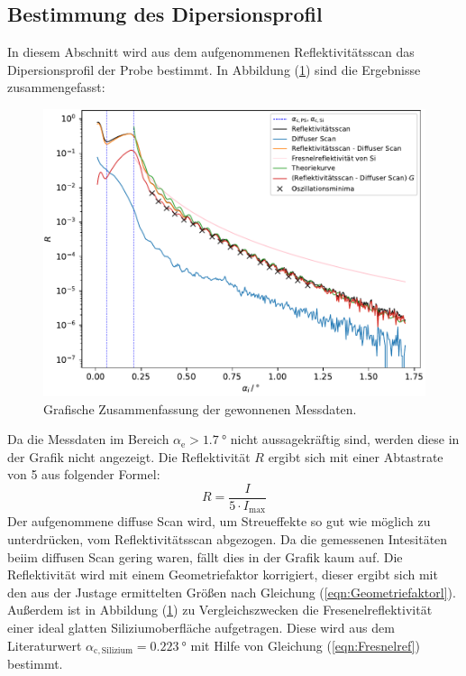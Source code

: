 \subsection{Bestimmung des Dipersionsprofil}
In diesem Abschnitt wird aus dem aufgenommenen Reflektivitätsscan das Dipersionsprofil der Probe bestimmt. In Abbildung (\ref{fig:messungr}) sind die Ergebnisse zusammengefasst:
\begin{figure}[h!]
  \centering
  \includegraphics[scale=0.7]{fig/plot_messung.pdf}
  \caption{Grafische Zusammenfassung der gewonnenen Messdaten.}
  \label{fig:messungr}
\end{figure}
\FloatBarrier
\noindent Da die Messdaten im Bereich $\alpha_\mathrm{e} > \SI{1.7}{\degree}$ nicht aussagekräftig sind, werden diese in der Grafik nicht angezeigt. Die Reflektivität $R$ ergibt sich mit einer Abtastrate von 5 aus folgender Formel:
\begin{equation}
  R=\dfrac{I}{5\cdot I_\mathrm{max}}
\end{equation}
Der aufgenommene diffuse Scan wird, um Streueffekte so gut wie möglich zu unterdrücken, vom Reflektivitätsscan abgezogen. Da die gemessenen Intesitäten beiim diffusen Scan gering waren, fällt
dies in der Grafik kaum auf. Die Reflektivität wird mit einem Geometriefaktor korrigiert, dieser ergibt sich mit den aus der Justage ermittelten Größen nach Gleichung (\ref{eqn:Geometriefaktorl}). Außerdem ist in Abbildung (\ref{fig:messungr}) zu Vergleichszwecken die Fresenelreflektivität einer ideal glatten Siliziumoberfläche  aufgetragen.
Diese wird aus dem Literaturwert \cite[5]{Anleitung3} $\alpha_\mathrm{c,Silizium} = \SI{0.223}{\degree}$ mit Hilfe von Gleichung (\ref{eqn:Fresnelref}) bestimmt. \\
\\
